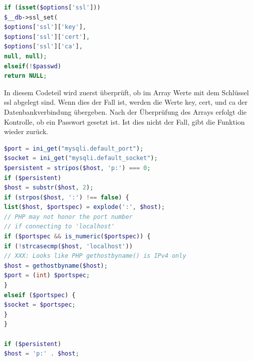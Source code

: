 \newpage

\begin{lstlisting}[language=PHP, caption=mysqli.php/function-db\_connect2, firstnumber=32]
if (isset($options['ssl']))
$__db->ssl_set(
$options['ssl']['key'],
$options['ssl']['cert'],
$options['ssl']['ca'],
null, null);
elseif(!$passwd)
return NULL;
\end{lstlisting}
In diesem Codeteil wird zuerst überprüft, ob im Array  Werte mit dem Schlüssel ssl abgelegt sind. Wenn dies der Fall ist, werden die Werte key, cert, und ca der Datenbankverbindung übergeben. Nach der Überprüfung des Arrays erfolgt die Kontrolle, ob ein Passwort gesetzt ist. Ist dies nicht der Fall, gibt die Funktion wieder  zurück.

\newpage

\begin{lstlisting}[language=PHP, caption=mysqli.php/function-db\_connect3, firstnumber=41]
$port = ini_get("mysqli.default_port");
$socket = ini_get("mysqli.default_socket");
$persistent = stripos($host, 'p:') === 0;
if ($persistent)
$host = substr($host, 2);
if (strpos($host, ':') !== false) {
list($host, $portspec) = explode(':', $host);
// PHP may not honor the port number 
// if connecting to 'localhost'
if ($portspec && is_numeric($portspec)) {
if (!strcasecmp($host, 'localhost'))
// XXX: Looks like PHP gethostbyname() is IPv4 only
$host = gethostbyname($host);
$port = (int) $portspec;
}
elseif ($portspec) {
$socket = $portspec;
}
}

if ($persistent)
$host = 'p:' . $host;
\end{lstlisting}

